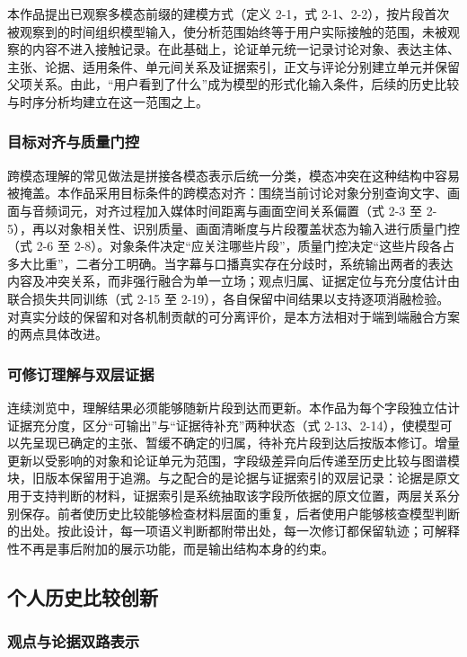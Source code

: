 本作品提出已观察多模态前缀的建模方式（定义 2-1，式 2-1、2-2），按片段首次被观察到的时间组织模型输入，使分析范围始终等于用户实际接触的范围，未被观察的内容不进入接触记录。在此基础上，论证单元统一记录讨论对象、表达主体、主张、论据、适用条件、单元间关系及证据索引，正文与评论分别建立单元并保留父项关系。由此，``用户看到了什么''成为模型的形式化输入条件，后续的历史比较与时序分析均建立在这一范围之上。

\subsubsection{目标对齐与质量门控}\label{section:4.2.2}

跨模态理解的常见做法是拼接各模态表示后统一分类，模态冲突在这种结构中容易被掩盖。本作品采用目标条件的跨模态对齐：围绕当前讨论对象分别查询文字、画面与音频词元，对齐过程加入媒体时间距离与画面空间关系偏置（式 2-3 至 2-5），再以对象相关性、识别质量、画面清晰度与片段覆盖状态为输入进行质量门控（式 2-6 至 2-8）。对象条件决定``应关注哪些片段''，质量门控决定``这些片段各占多大比重''，二者分工明确。当字幕与口播真实存在分歧时，系统输出两者的表达内容及冲突关系，而非强行融合为单一立场；观点归属、证据定位与充分度估计由联合损失共同训练（式 2-15 至 2-19），各自保留中间结果以支持逐项消融检验。对真实分歧的保留和对各机制贡献的可分离评价，是本方法相对于端到端融合方案的两点具体改进。

\subsubsection{可修订理解与双层证据}\label{section:4.2.3}

连续浏览中，理解结果必须能够随新片段到达而更新。本作品为每个字段独立估计证据充分度，区分``可输出''与``证据待补充''两种状态（式 2-13、2-14），使模型可以先呈现已确定的主张、暂缓不确定的归属，待补充片段到达后按版本修订。增量更新以受影响的对象和论证单元为范围，字段级差异向后传递至历史比较与图谱模块，旧版本保留用于追溯。与之配合的是论据与证据索引的双层记录：论据是原文用于支持判断的材料，证据索引是系统抽取该字段所依据的原文位置，两层关系分别保存。前者使历史比较能够检查材料层面的重复，后者使用户能够核查模型判断的出处。按此设计，每一项语义判断都附带出处，每一次修订都保留轨迹；可解释性不再是事后附加的展示功能，而是输出结构本身的约束。

\subsection{个人历史比较创新}\label{section:4.3}

\subsubsection{观点与论据双路表示}\label{section:4.3.1}

